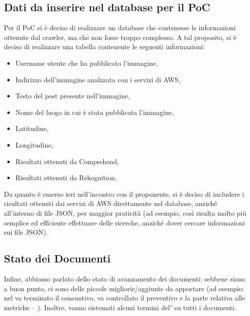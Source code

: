 \subsection{Dati da inserire nel database per il PoC}

Per il PoC si è deciso di realizzare un database che contenesse le informazioni ottenute dal crawler, ma che non fosse troppo complesso. A tal proposito, si è deciso di realizzare una tabella contenente le seguenti informazioni:

\begin{itemize}
\item Username utente che ha pubblicato l'immagine,
\item Indirizzo dell'immagine analzzata con i servizi di AWS,
\item Testo del post presente nell'immagine,
\item Nome del luogo in cui è stata pubblicata l'immagine,
\item Latitudine,
\item Longitudine,
\item Risultati ottenuti da Comprehend,
\item Risultati ottenuti da Rekognition.
\end{itemize}

Da quanto è emerso ieri nell'incontro con il proponente, si è deciso di includere i risultati ottenuti dai servizi di AWS direttamente nel database, anziché all'interno di file JSON, per maggior praticità (ad esempio, così risulta molto più semplice ed efficiente effettuare delle ricerche, anziché dover cercare informazioni sui file JSON).

\subsection{Stato dei Documenti}

Infine, abbiamo parlato dello stato di avanzamento dei documenti: sebbene siano a buon punto, ci sono delle piccole migliorie/aggiunte da apportare (ad esempio: nel \textit{\PdQ} va terminato il consuntivo, va controllato il preventivo e la parte relativa alle metriche – ). Inoltre, vanno sistemati alcuni termini del \textit{\G} su tutti i documenti.
